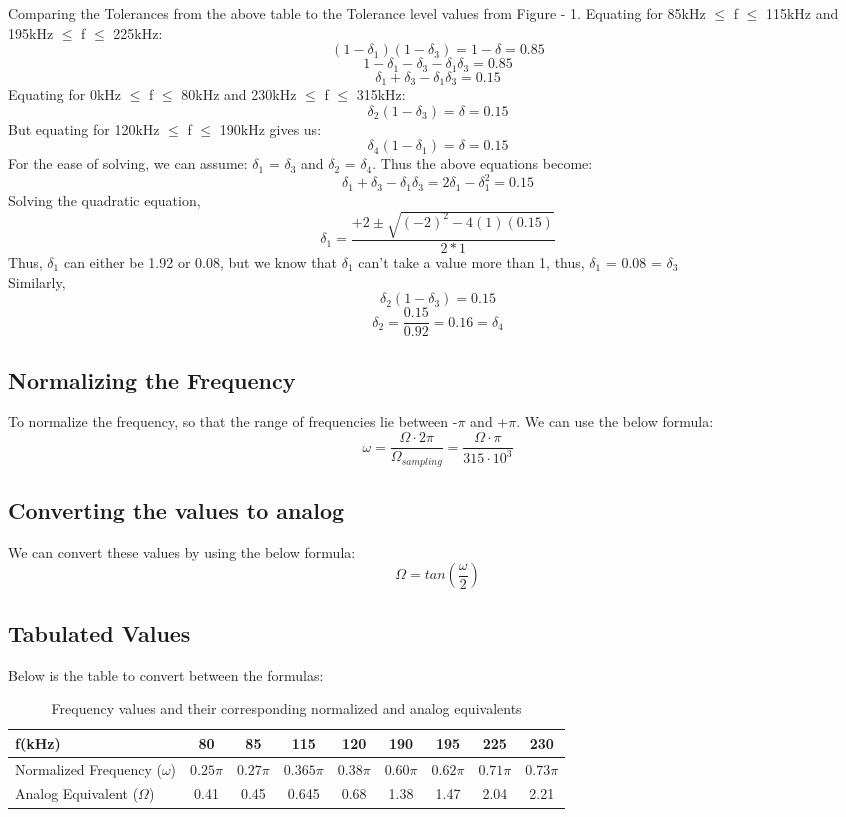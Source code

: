 \documentclass{article}
\begin{document}
Comparing the Tolerances from the above table to the Tolerance level values from Figure - 1. 
Equating for 85kHz $\leq$ f $\leq$ 115kHz and 195kHz $\leq$ f $\leq$ 225kHz:
\[
    (1-\delta_1)(1-\delta_3) = 1- \delta = 0.85
\]
\[
    1 - \delta_1 - \delta_3 - \delta_1\delta_3 = 0.85
\]
\[
    \delta_1 + \delta_3 - \delta_1 \delta_3 = 0.15
\]
Equating for 0kHz $\leq$ f $\leq$ 80kHz and 230kHz $\leq$ f $\leq$ 315kHz:
\[
    \delta_2 ( 1- \delta_3) = \delta = 0.15 
\]
But equating for 120kHz $\leq$ f $\leq$ 190kHz gives us:
\[
    \delta_4 ( 1- \delta_1) = \delta = 0.15
\]
For the ease of solving, we can assume: $\delta_1$ = $\delta_3$ and $\delta_2$ = $\delta_4$. Thus the above equations become:
\[
    \delta_1 + \delta_3 - \delta_1 \delta_3 = 2\delta_1 - \delta_1^2 = 0.15
\]
Solving the quadratic equation, 
\[
    \delta_1 = \frac{+2 \pm \sqrt{(-2)^2 - 4(1)(0.15)}}{2*1}
\]
Thus, $\delta_1$ can either be 1.92 or 0.08, but we know that $\delta_1$ can't take a value more than 1, thus, $\delta_1$ = 0.08 = $\delta_3$\\
Similarly,
\[
    \delta_2 ( 1- \delta_3) = 0.15
\]
\[
    \delta_2 = \frac{0.15}{0.92} = 0.16 = \delta_4
\]
\subsection{Normalizing the Frequency}
To normalize the frequency, so that the range of frequencies lie between -$\pi$ and +$\pi$. We can use the below formula:
\[
    \omega = \frac{\Omega \cdot 2\pi}{\Omega_{sampling}} = \frac{\Omega\cdot\pi}{315\cdot 10^3}
\]
\subsection{Converting the values to analog}
We can convert these values by using the below formula:
\[
    \Omega = tan(\frac{\omega}{2})
\]

\subsection{Tabulated Values}
Below is the table to convert between the formulas:
\begin{table}[h]
    \centering
    \renewcommand{\arraystretch}{1.3}
    \begin{tabular}{|l|c|c|c|c|c|c|c|c|} \hline
        f(kHz) & 80 & 85 & 115 & 120 & 190 & 195 & 225 & 230 \\ \hline
        Normalized Frequency ($\omega$) & $0.25\pi$ & $0.27\pi$ & $0.365\pi$ & $0.38\pi$ & $0.60\pi$ & $0.62\pi$ & $0.71\pi$ & $0.73\pi$ \\ \hline
        Analog Equivalent ($\Omega$) & 0.41 & 0.45 & 0.645 & 0.68 & 1.38 & 1.47 & 2.04 & 2.21 \\ \hline
    \end{tabular}
    \caption{Frequency values and their corresponding normalized and analog equivalents}
\end{table}
\end{document}
